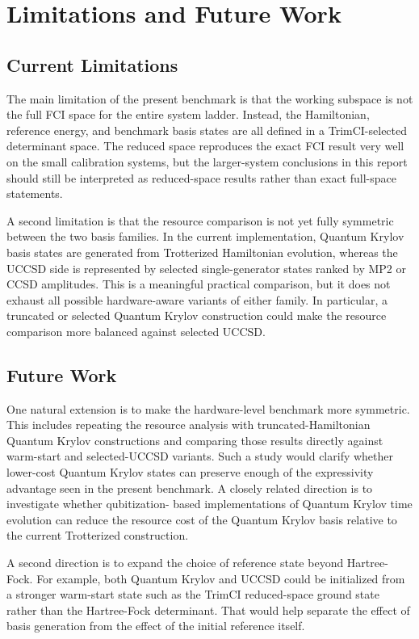 \section{Limitations and Future Work}

\subsection{Current Limitations}

The main limitation of the present benchmark is that the working subspace is
not the full FCI space for the entire system ladder. Instead, the Hamiltonian,
reference energy, and benchmark basis states are all defined in a
TrimCI-selected determinant space. The reduced space reproduces the exact FCI
result very well on the small calibration systems, but the larger-system
conclusions in this report should still be interpreted as reduced-space
results rather than exact full-space statements.

A second limitation is that the resource comparison is not yet fully symmetric
between the two basis families. In the current implementation, Quantum Krylov basis
states are generated from Trotterized Hamiltonian evolution, whereas the UCCSD
side is represented by selected single-generator states ranked by MP2 or CCSD
amplitudes. This is a meaningful practical comparison, but it does not exhaust
all possible hardware-aware variants of either family. In particular, a
truncated or selected Quantum Krylov construction could make the resource comparison
more balanced against selected UCCSD.

\subsection{Future Work}

One natural extension is to make the hardware-level benchmark more symmetric.
This includes repeating the resource analysis with truncated-Hamiltonian Quantum Krylov
constructions and comparing those results directly against warm-start and
selected-UCCSD variants. Such a study would clarify whether lower-cost Quantum Krylov
states can preserve enough of the expressivity advantage seen in the present
benchmark. A closely related direction is to investigate whether qubitization-
based implementations of Quantum Krylov time evolution can reduce the resource cost of
the Quantum Krylov basis relative to the current Trotterized construction.

A second direction is to expand the choice of reference state beyond
Hartree-Fock. For example, both Quantum Krylov and UCCSD could be initialized from a
stronger warm-start state such as the TrimCI reduced-space ground state rather
than the Hartree-Fock determinant. That would help separate the effect of basis
generation from the effect of the initial reference itself.

